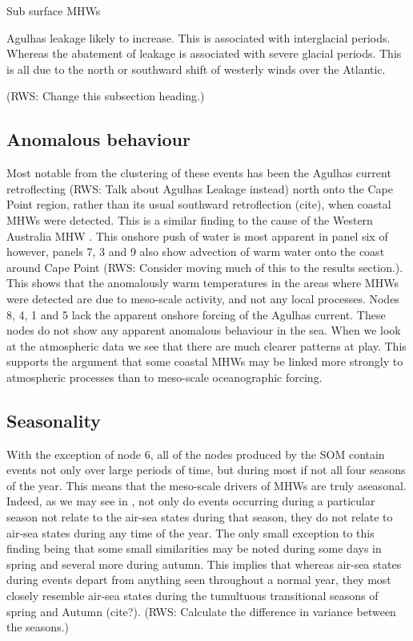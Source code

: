 \documentclass[a4paper,10pt,review]{elsarticle}
\begin{document}
\citet{Schaeffer2017} Sub surface MHWs

\citet{Beal2011} Agulhas leakage likely to increase. This is associated with interglacial periods. Whereas the abatement of leakage is associated with severe glacial periods. This is all due to the north or southward shift of westerly winds over the Atlantic.

(RWS: Change this subsection heading.)
\subsection{Anomalous behaviour}
Most notable from the clustering of these events has been the Agulhas current retroflecting (RWS: Talk about Agulhas Leakage instead) north onto the Cape Point region, rather than its usual southward retroflection (cite), when coastal MHWs were detected. This is a similar finding to the cause of the Western Australia MHW \citep{Feng2013, Benthuysen2014}. This onshore push of water is most apparent in panel six of  however, panels 7, 3 and 9 also show advection of warm water onto the coast around Cape Point (RWS: Consider moving much of this to the results section.). This shows that the anomalously warm temperatures in the areas where MHWs were detected are due to meso-scale activity, and not any local processes. Nodes 8, 4, 1 and 5 lack the apparent onshore forcing of the Agulhas current. These nodes do not show any apparent anomalous behaviour in the sea. When we look at the atmospheric data we see that there are much clearer patterns at play. This supports the argument that some coastal MHWs may be linked more strongly to atmospheric processes than to meso-scale oceanographic forcing.

\subsection{Seasonality}
With the exception of node 6, all of the nodes produced by the SOM contain events not only over large periods of time, but during most if not all four seasons of the year. This means that the meso-scale drivers of MHWs are truly aseasonal. Indeed, as we may see in , not only do events occurring during a particular season not relate to the air-sea states during that season, they do not relate to air-sea states during any time of the year. The only small exception to this finding being that some small similarities may be noted during some days in spring and several more during autumn. This implies that whereas air-sea states during events depart from anything seen throughout a normal year, they most closely resemble air-sea states during the tumultuous transitional seasons of spring and Autumn (cite?). (RWS: Calculate the difference in variance between the seasons.)
\end{document}
